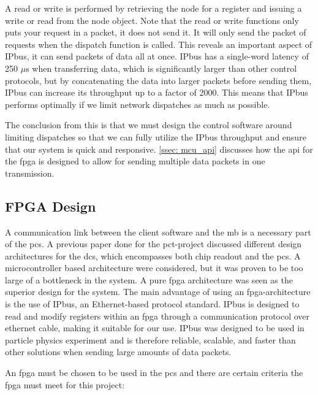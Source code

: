 \documentclass[main.tex]{subfiles}
\begin{document}
A read or write is performed by retrieving the node for a register and issuing a write or read from the node object. Note that the read or write functions only puts your request in a packet, it does not send it. It will only send the packet of requests when the dispatch function is called. This reveals an important aspect of IPbus, it can send packets of data all at once. IPbus has a single-word latency of 250 $\mu$s when transferring data, which is significantly larger than other control protocols, but by concatenating the data into larger packets before sending them, IPbus can increase its throughput up to a factor of 2000\cite{IPbus}. This means that IPbus performs optimally if we limit network dispatches as much as possible.

The conclusion from this is that we must design the control software around limiting dispatches so that we can fully utilize the IPbus throughput and ensure that our system is quick and responsive. \autoref{ssec: mcu_api} discusses how the \gls{api} for the \gls{fpga} is designed to allow for sending multiple data packets in one transmission.


\subsection{FPGA Design}
\label{section: fpga_design}
A communication link between the client software and the \gls{mb} is a necessary part of the \gls{pcs}. A previous paper done for the \gls{pct}-project discussed different design architectures for the \gls{dcs}, which encompasses both chip readout and the \gls{pcs}\cite{ola}. A microcontroller based architecture were considered, but it was proven to be too large of a bottleneck in the system. A pure \gls{fpga} architecture was seen as the superior design for the system. The main advantage of using an \gls{fpga}-architecture is the use of IPbus, an Ethernet-based protocol standard. IPbus is designed to read and modify registers within an \gls{fpga} through a communication protocol over ethernet cable, making it suitable for our use.  IPbus was designed to be used in particle physics experiment and is therefore reliable, scalable, and faster than other solutions when sending large amounts of data packets.

An \gls{fpga} must be chosen to be used in the \gls{pcs} and there are certain criteria the \gls{fpga} must meet for this project:
\end{document}
